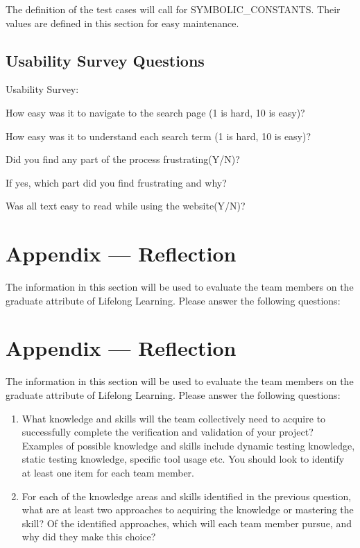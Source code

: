 \documentclass[12pt, titlepage]{article}
\begin{document}
The definition of the test cases will call for SYMBOLIC\_CONSTANTS.
Their values are defined in this section for easy maintenance.

\subsection{Usability Survey Questions}
\label{sec:Appendix}
Usability Survey:

How easy was it to navigate to the search page (1 is hard, 10 is easy)?

How easy was it to understand each search term (1 is hard, 10 is easy)?

Did you find any part of the process frustrating(Y/N)?

If yes, which part did you find frustrating and why?

Was all text easy to read while using the website(Y/N)?

\newpage{}
\section*{Appendix --- Reflection}

The information in this section will be used to evaluate the team members on the
graduate attribute of Lifelong Learning.  Please answer the following questions:

\newpage{}
\section*{Appendix --- Reflection}


The information in this section will be used to evaluate the team members on the
graduate attribute of Lifelong Learning.  Please answer the following questions:

\begin{enumerate}
  \item What knowledge and skills will the team collectively need to acquire to
  successfully complete the verification and validation of your project?
  Examples of possible knowledge and skills include dynamic testing knowledge,
  static testing knowledge, specific tool usage etc.  You should look to
  identify at least one item for each team member.
  \item For each of the knowledge areas and skills identified in the previous
  question, what are at least two approaches to acquiring the knowledge or
  mastering the skill?  Of the identified approaches, which will each team
  member pursue, and why did they make this choice?
\end{enumerate}
\end{document}

